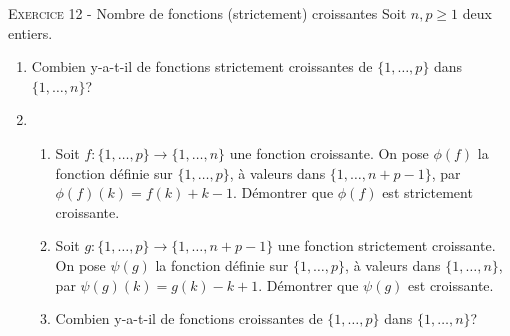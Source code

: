 \vskip0.3cm\noindent\textsc{Exercice 12} - Nombre de fonctions (strictement) croissantes
\vskip0.2cm
Soit $n,p\geq 1$ deux entiers.
\begin{enumerate}
\item Combien y-a-t-il de fonctions strictement croissantes de $\{1,\dots,p\}$ dans $\{1,\dots,n\}$?
\item \begin{enumerate}
\item Soit $f:\{1,\dots,p\}\to\{1,\dots,n\}$ une fonction croissante. On pose $\phi(f)$ la fonction définie sur $\{1,\dots,p\}$, à valeurs dans $\{1,\dots,n+p-1\}$, par $\phi(f)(k)=f(k)+k-1$. Démontrer que $\phi(f)$ est strictement croissante.
\item Soit $g:\{1,\dots,p\}\to\{1,\dots,n+p-1\}$ une fonction strictement croissante. On pose $\psi(g)$ la fonction définie sur $\{1,\dots,p\}$, à valeurs dans $\{1,\dots,n\}$, par $\psi(g)(k)=g(k)-k+1$. Démontrer que $\psi(g)$ est croissante.
\item Combien y-a-t-il de fonctions croissantes de $\{1,\dots,p\}$ dans $\{1,\dots,n\}$?
\end{enumerate}
\end{enumerate}




\vskip0.5cm

